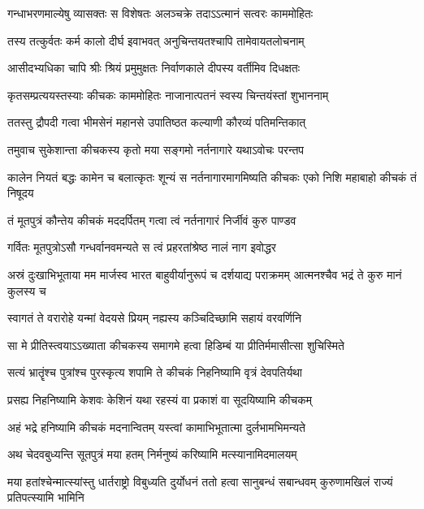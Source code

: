 \twolineshloka
{गन्धाभरणमाल्येषु व्यासक्तः स विशेषतः}
{अलञ्चक्रे तदाऽऽत्मानं सत्वरः काममोहितः}


\twolineshloka
{तस्य तत्कुर्वतः कर्म कालो दीर्घ इवाभवत्}
{अनुचिन्तयतश्चापि तामेवायतलोचनाम्}


\twolineshloka
{आसीदभ्यधिका चापि श्रीः श्रियं प्रमुमुक्षतः}
{निर्वाणकाले दीपस्य वर्तीमिव दिधक्षतः}


\twolineshloka
{कृतसम्प्रत्ययस्तस्याः कीचकः काममोहितः}
{नाजानात्पतनं स्वस्य चिन्तयंस्तां शुभाननाम्}


\twolineshloka
{ततस्तु द्रौपदी गत्वा भीमसेनं महानसे}
{उपातिष्ठत कल्याणी कौरव्यं पतिमन्तिकात्}


\twolineshloka
{तमुवाच सुकेशान्ता कीचकस्य कृतो मया}
{सङ्गमो नर्तनागारे यथाऽवोचः परन्तप}


\threelineshloka
{कालेन नियतं बद्धः कामेन च बलात्कृतः}
{शून्यं स नर्तनागारमागमिष्यति कीचकः}
{एको निशि महाबाहो कीचकं तं निषूदय}


\twolineshloka
{तं मूतपुत्रं कौन्तेय कीचकं मददर्पितम्}
{गत्वा त्वं नर्तनागारं निर्जीवं कुरु पाण्डव}


\twolineshloka
{गर्वितः मूतपुत्रोऽसौ गन्धर्वानवमन्यते}
{स त्वं प्रहरतांश्रेष्ठ नालं नाग इवोद्धर}


\threelineshloka
{अस्रं दुःखाभिभूताया मम मार्जस्व भारत}
{बाहुवीर्यानुरूपं च दर्शयाद्य पराक्रमम्}
{आत्मनश्चैव भद्रं ते कुरु मानं कुलस्य च}




\twolineshloka
{स्वागतं ते वरारोहे यन्मां वेदयसे प्रियम्}
{नह्यस्य कञ्चिदिच्छामि सहायं वरवर्णिनि}


\twolineshloka
{सा मे प्रीतिस्त्वयाऽऽख्याता कीचकस्य समागमे}
{हत्वा हिडिम्बं या प्रीतिर्ममासीत्सा शुचिस्मिते}


\twolineshloka
{सत्यं भ्रातॄंश्च पुत्रांश्च पुरस्कृत्य शपामि ते}
{कीचकं निहनिष्यामि वृत्रं देवपतिर्यथा}


\twolineshloka
{प्रसह्य निहनिष्यामि केशवः केशिनं यथा}
{रहस्यं वा प्रकाशं वा सूदयिष्यामि कीचकम्}


\twolineshloka
{अहं भद्रे हनिष्यामि कीचकं मदनान्वितम्}
{यस्त्वां कामाभिभूतात्मा दुर्लभामभिमन्यते}


\twolineshloka
{अथ चेदवबुध्यन्ति सूतपुत्रं मया हतम्}
{निर्मनुष्यं करिष्यामि मत्स्यानामिदमालयम्}


\threelineshloka
{मया हतांश्चेन्मात्स्यांस्तु धार्तराष्ट्रो विबुध्यति}
{दुर्योधनं ततो हत्वा सानुबन्धं सबान्धवम्}
{कुरुणामखिलं राज्यं प्रतिपत्स्यामि भामिनि}


